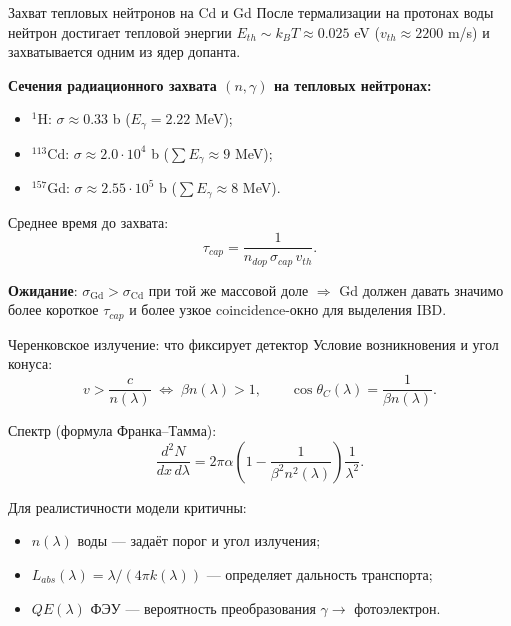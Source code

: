 \documentclass[aspectratio=169,12pt]{beamer}
\begin{document}
\begin{frame}{Захват тепловых нейтронов на Cd и Gd}
После термализации на протонах воды нейтрон достигает тепловой энергии $E_{th}\sim k_BT\approx 0{.}025$ eV ($v_{th}\approx 2200$ m/s) и захватывается одним из ядер допанта.

\medskip
\textbf{Сечения радиационного захвата $(n,\gamma)$ на тепловых нейтронах:}
\begin{itemize}
    \item $^1$H: $\sigma\approx 0{.}33$ b ($E_\gamma = 2{.}22$ MeV);
    \item $^{113}$Cd: $\sigma\approx 2{.}0\cdot 10^4$ b ($\sum E_\gamma\approx 9$ MeV);
    \item $^{157}$Gd: $\sigma\approx 2{.}55\cdot 10^5$ b ($\sum E_\gamma\approx 8$ MeV).
\end{itemize}

\medskip
Среднее время до захвата:
\begin{equation}
    \tau_{cap} = \frac{1}{n_{dop}\,\sigma_{cap}\,v_{th}}.
\end{equation}

\smallskip
\textbf{Ожидание}: $\sigma_\text{Gd} > \sigma_\text{Cd}$ при той же массовой доле $\Rightarrow$ Gd должен давать значимо более короткое $\tau_{cap}$ и более узкое coincidence-окно для выделения IBD.
\end{frame}

\begin{frame}{Черенковское излучение: что фиксирует детектор}
Условие возникновения и угол конуса:
\begin{equation}
    v>\frac{c}{n(\lambda)} \;\Leftrightarrow\; \beta n(\lambda)>1,\qquad \cos\theta_C(\lambda)=\frac{1}{\beta n(\lambda)}.
\end{equation}

\medskip
Спектр (формула Франка–Тамма):
\begin{equation}
    \frac{d^2N}{dx\,d\lambda}=2\pi\alpha\left(1-\frac{1}{\beta^2 n^2(\lambda)}\right)\frac{1}{\lambda^2}.
\end{equation}

\medskip
Для реалистичности модели критичны:
\begin{itemize}
    \item $n(\lambda)$ воды — задаёт порог и угол излучения;
    \item $L_{abs}(\lambda) = \lambda / (4\pi k(\lambda))$ — определяет дальность транспорта;
    \item $QE(\lambda)$ ФЭУ — вероятность преобразования $\gamma \to$ фотоэлектрон.
\end{itemize}
\end{frame}
\end{document}

